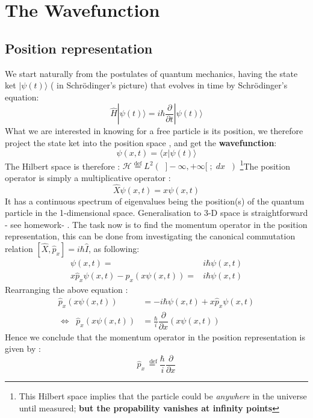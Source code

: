 \chapter{The Wavefunction}
  \section{Position representation }
  We start naturally from the postulates of quantum mechanics, having the state ket $ | \psi(t) \rangle $ ( in Schr\"{o}dinger's picture) that evolves in time by Schr\"{o}dinger's equation:
  \begin{equation}
  \hat{H} | \psi(t) \rangle = i \hbar \dfrac{\partial}{\partial t} | \psi(t) \rangle
  \end{equation}
  What we are interested in knowing for a free particle is its position, we therefore project the state ket into the position space , and get the \textbf{wavefunction}:
  \begin{equation}
  \psi (x,t) = \langle x | \psi (t) \rangle 
  \end{equation}
  The Hilbert space is therefore : $ \mathcal{H} \overset{\text{def}}{=} L ^2 (\; \; ] -\infty,+\infty[\; ;\; dx\; \; )$ \footnote{ This Hilbert space implies that the particle could be \textit{anywhere} in the universe until measured; \textbf{but the propability vanishes at infinity points} }The position operator is simply a multiplicative operator :
  \begin{equation}
  \hat{X} \psi (x,t) = x \psi(x,t) 
  \end{equation}
  It has a continuous spectrum of eigenvalues being the position(s) of the quantum particle in the 1-dimensional space. Generalisation to 3-D space is straightforward - see homework- . The task now is to find the momentum operator in the position representation, this can be done from investigating the canonical commutation relation $ [\hat{X}, \hat{p}_x]= i \hbar \hat{I}$, as following:
  \begin{align}
  [\hat{X}, \hat{p}_x] \psi(x,t)=& i \hbar \psi(x,t)  \nonumber \\
  x \hat{p}_x \psi(x,t) - \hat{p}_x ( x \psi (x,t)) =& i \hbar \psi (x,t) 
  \end{align}
  Rearranging the above equation :
  \begin{align}
  \hat{p}_x ( x \psi (x,t)) &= - i \hbar \psi (x,t)  + x \hat{p}_x \psi(x,t)\nonumber\\
  \Leftrightarrow \; \; \hat{p}_x ( x \psi (x,t)) &=\frac{\hbar}{i} \dfrac{\partial}{\partial x}\left( x \psi (x,t) \right) 
  \end{align}
  Hence we conclude that the momentum operator in the position representation is given by :
  \begin{equation}
  \boxed {\hat{p}_x \overset{\text{ def}}{=} \frac{\hbar}{i} \dfrac{\partial}{\partial x}}
  \end{equation}
